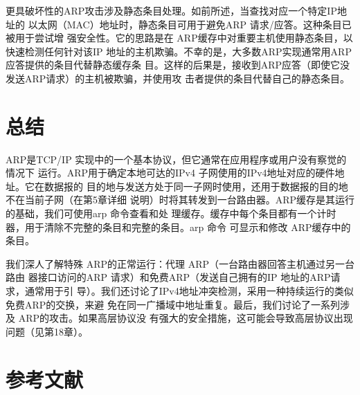 更具破坏性的ARP攻击涉及静态条目处理。如前所述，当查找对应一个特定IP地址的
以太网（MAC）地址时，静态条目可用于避免ARP 请求/应答。这种条目已被用于尝试增
强安全性。它的思路是在 ARP缓存中对重要主机使用静态条目，以快速检测任何针对该IP
地址的主机欺骗。不幸的是，大多数ARP实现通常用ARP应答提供的条目代替静态缓存条
目。这样的后果是，接收到ARP应答（即使它没发送ARP请求）的主机被欺骗，并使用攻
击者提供的条目代替自己的静态条目。

\section{总结}

ARP是TCP/IP 实现中的一个基本协议，但它通常在应用程序或用户没有察觉的情况下
运行。ARP用于确定本地可达的IPv4 子网使用的IPv4地址对应的硬件地址。它在数据报的
目的地与发送方处于同一子网时使用，还用于数据报的目的地不在当前子网（在第5章详细
说明）时将其转发到一台路由器。ARP缓存是其运行的基础，我们可使用arp 命令查看和处
理缓存。缓存中每个条目都有一个计时器，用于清除不完整的条目和完整的条目。arp 命令
可显示和修改 ARP缓存中的条目。

我们深人了解特殊 ARP的正常运行：代理 ARP（一台路由器回答主机通过另一台路由
器接口访问的ARP 请求）和免费ARP（发送自己拥有的IP 地址的ARP请求，通常用于引
导）。我们还讨论了IPv4地址冲突检测，采用一种持续运行的类似免费ARP的交换，来避
免在同一广播域中地址重复。最后，我们讨论了一系列涉及 ARP的攻击。如果高层协议没
有强大的安全措施，这可能会导致高层协议出现问题（见第18章）。

\section{参考文献}
